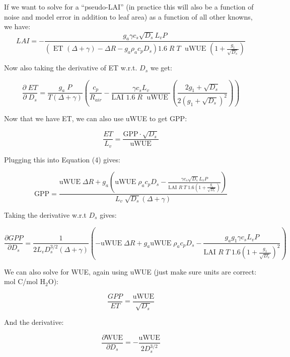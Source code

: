 If we want to solve for a ``pseudo-LAI'' (in practice this will also be a function of noise and model error in addition to leaf area) as a function of all other knowns, we have:
\begin{equation}
LAI  = - \frac{g_a \gamma c_s \sqrt{D_s} L_v P }{ \left(\text{ ET } ( \Delta + \gamma) - \Delta R - g_a \rho_a c_p D_{s}\right) 1.6 \; R\; T\; \text{ uWUE } (1 + \frac{g_1}{\sqrt{D_s}})}
\end{equation}

Now also taking the derivative of ET w.r.t. $D_s$ we get:

\begin{equation}
\frac{\partial \;  ET}{\partial \; D_s} = \frac{g_a \; P}{T(\Delta + \gamma)}   \left(\frac{ c_p}{R_{air}} - \frac{\gamma c_s L_v  }{\text{LAI }1.6 \; R\; \text{ uWUE }} \left( \frac{2 g_1 + \sqrt{D_s}}{2 (g_1 + \sqrt{D_s})^2}\right) \right)
\end{equation}

Now that we have ET, we can also use uWUE to get GPP:

\begin{equation}
  \frac{ET}{L_v} = \frac{\text{GPP} \cdot \sqrt{D_s}}{  \text{uWUE}}
\end{equation}

Plugging this into Equation (4) gives:

\begin{equation}
  \text{GPP} = \frac{\text{uWUE}\; \Delta R + g_a \left( \text{uWUE}\; \rho_a c_p D_{s} - \frac{\gamma c_s \sqrt{D_s} L_v P }{\text{LAI } R \; T \; 1.6  (1 + \frac{g_1}{\sqrt{D_s}})} \right) }{L_v \; \sqrt{D_s} \left(\Delta + \gamma \right)}
\end{equation}

Taking the derivative w.r.t $D_s$ gives:

\begin{equation}
  \frac{\partial GPP}{\partial D_s} = \frac{1}{2 L_v D_s^{3/2} \left(\Delta + \gamma \right)} \left( -\text{uWUE}\; \Delta R + g_a \text{uWUE}\; \rho_a c_p  D_s - \frac{g_a g_1  \gamma c_s L_v P }{\text{LAI } R \; T \; 1.6 ( 1 + \frac{g_1}{\sqrt{D_s}})^2 } \right)
\end{equation}

We can also solve for WUE, again using uWUE (just make sure units are correct: mol C/mol H$_2$O):

\begin{equation}
\frac{GPP}{ET} = \frac{\text{uWUE}}{\sqrt{D_s}}
\end{equation}

And the derivative:

\begin{equation}
  \frac{\partial \text{WUE}}{\partial D_s} = -\frac{\text{uWUE}}{2 D_s^{3/2}}
\end{equation}


